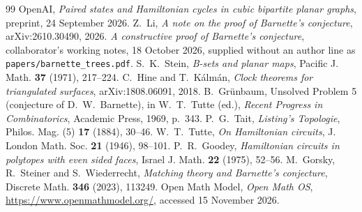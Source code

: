 \documentclass[11pt,a4paper]{article}
\begin{document}
{\footnotesize
\begin{thebibliography}{99}
\setlength{\itemsep}{0pt}\setlength{\parskip}{0pt}
 OpenAI, \emph{Paired states and Hamiltonian cycles in cubic bipartite planar graphs}, preprint, 24 September 2026.
 Z.~Li, \emph{A note on the proof of Barnette's conjecture}, arXiv:2610.30490, 2026.
 \emph{A constructive proof of Barnette's conjecture}, collaborator's working notes, 18 October 2026, supplied without an author line as \texttt{papers/barnette\_trees.pdf}.
 S.~K.~Stein, \emph{B-sets and planar maps}, Pacific J. Math. \textbf{37} (1971), 217--224.
 C.~Hine and T.~K\'alm\'an, \emph{Clock theorems for triangulated surfaces}, arXiv:1808.06091, 2018.
 B.~Gr\"unbaum, Unsolved Problem 5 (conjecture of D.~W.~Barnette), in W.~T.~Tutte (ed.), \emph{Recent Progress in Combinatorics}, Academic Press, 1969, p.~343.
 P.~G.~Tait, \emph{Listing's Topologie}, Philos. Mag. (5) \textbf{17} (1884), 30--46.
 W.~T.~Tutte, \emph{On Hamiltonian circuits}, J. London Math. Soc. \textbf{21} (1946), 98--101.
 P.~R.~Goodey, \emph{Hamiltonian circuits in polytopes with even sided faces}, Israel J. Math. \textbf{22} (1975), 52--56.
 M.~Gorsky, R.~Steiner and S.~Wiederrecht, \emph{Matching theory and Barnette's conjecture}, Discrete Math. \textbf{346} (2023), 113249.
 Open Math Model, \emph{Open Math OS}, \url{https://www.openmathmodel.org/}, accessed 15 November 2026.
\end{thebibliography}}
\end{document}
